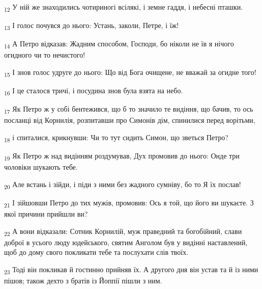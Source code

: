 \begin{tcolorbox}
\textsubscript{12} У ній же знаходились чотириногі всілякі, і земне гаддя, і небесні пташки.
\end{tcolorbox}
\begin{tcolorbox}
\textsubscript{13} І голос почувся до нього: Устань, заколи, Петре, і їж!
\end{tcolorbox}
\begin{tcolorbox}
\textsubscript{14} А Петро відказав: Жадним способом, Господи, бо ніколи не їв я нічого огидного чи то нечистого!
\end{tcolorbox}
\begin{tcolorbox}
\textsubscript{15} І знов голос удруге до нього: Що від Бога очищене, не вважай за огидне того!
\end{tcolorbox}
\begin{tcolorbox}
\textsubscript{16} І це сталося тричі, і посудина знов була взята на небо.
\end{tcolorbox}
\begin{tcolorbox}
\textsubscript{17} Як Петро ж у собі бентежився, що б то значило те видіння, що бачив, то ось посланці від Корнилія, розпитавши про Симонів дім, спинилися перед ворітьми,
\end{tcolorbox}
\begin{tcolorbox}
\textsubscript{18} і спиталися, крикнувши: Чи то тут сидить Симон, що зветься Петро?
\end{tcolorbox}
\begin{tcolorbox}
\textsubscript{19} Як Петро ж над видінням роздумував, Дух промовив до нього: Онде три чоловіки шукають тебе.
\end{tcolorbox}
\begin{tcolorbox}
\textsubscript{20} Але встань і зійди, і піди з ними без жадного сумніву, бо то Я їх послав!
\end{tcolorbox}
\begin{tcolorbox}
\textsubscript{21} І зійшовши Петро до тих мужів, промовив: Ось я той, що його ви шукаєте. З якої причини прийшли ви?
\end{tcolorbox}
\begin{tcolorbox}
\textsubscript{22} А вони відказали: Сотник Корнилій, муж праведний та богобійний, слави доброї в усього люду юдейського, святим Анголом був у видінні наставлений, щоб до дому свого покликати тебе та послухати слів твоїх.
\end{tcolorbox}
\begin{tcolorbox}
\textsubscript{23} Тоді він покликав й гостинно прийняв їх. А другого дня він устав та й із ними пішов; також дехто з братів із Йоппії пішли з ним.
\end{tcolorbox}
